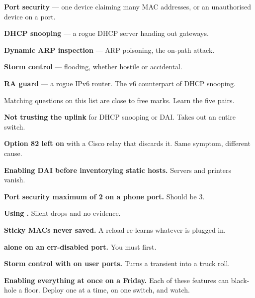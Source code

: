 \begin{examnote}
\begin{tight}
  \item \textbf{Port security} --- one device claiming many MAC addresses, or an
        unauthorised device on a port.
  \item \textbf{DHCP snooping} --- a rogue DHCP server handing out gateways.
  \item \textbf{Dynamic ARP inspection} --- ARP poisoning, the on-path attack.
  \item \textbf{Storm control} --- flooding, whether hostile or accidental.
  \item \textbf{RA guard} --- a rogue IPv6 router. The v6 counterpart of DHCP
        snooping.
\end{tight}
Matching questions on this list are close to free marks. Learn the five pairs.
\end{examnote}

\begin{pitfall}
\begin{tight}
  \item \textbf{Not trusting the uplink} for DHCP snooping or DAI. Takes out an
        entire switch.
  \item \textbf{Option 82 left on} with a Cisco relay that discards it. Same
        symptom, different cause.
  \item \textbf{Enabling DAI before inventorying static hosts.} Servers and
        printers vanish.
  \item \textbf{Port security maximum of 2 on a phone port.} Should be 3.
  \item \textbf{Using .} Silent drops and no evidence.
  \item \textbf{Sticky MACs never saved.} A reload re-learns whatever is plugged
        in.
  \item \textbf{ alone on an err-disabled port.} You must
         first.
  \item \textbf{Storm control with  on user ports.} Turns a
        transient into a truck roll.
  \item \textbf{Enabling everything at once on a Friday.} Each of these features
        can black-hole a floor. Deploy one at a time, on one switch, and watch.
\end{tight}
\end{pitfall}

